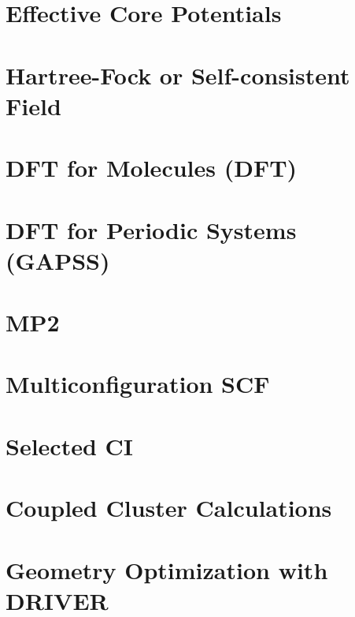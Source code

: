 \chapter{Effective Core Potentials}


\chapter{Hartree-Fock or Self-consistent Field} 


\chapter{DFT for Molecules (DFT)}


\chapter{DFT for Periodic Systems (GAPSS)}


\chapter{MP2}


\chapter{Multiconfiguration SCF}


\chapter{Selected CI}


\chapter{Coupled Cluster Calculations}


%


\chapter{Geometry Optimization with DRIVER}


